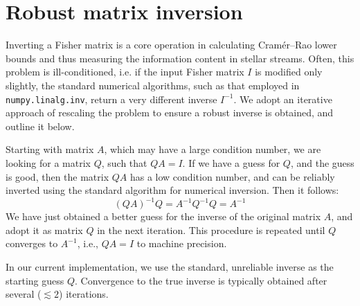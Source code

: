 \documentclass[modern]{aastex61}
\begin{document}



\appendix
\section{Robust matrix inversion}
Inverting a Fisher matrix is a core operation in calculating Cram\' er--Rao lower bounds and thus measuring the information content in stellar streams. 
Often, this problem is ill-conditioned, i.e. if the input Fisher matrix $I$ is modified only slightly, the standard numerical algorithms, such as that employed in \texttt{numpy.linalg.inv}, return a very different inverse $I^{-1}$.
We adopt an iterative approach of rescaling the problem to ensure a robust inverse is obtained, and outline it below.

Starting with matrix $A$, which may have a large condition number, we are looking for a matrix $Q$, such that $Q A = I$.
If we have a guess for $Q$, and the guess is good, then the matrix $QA$ has a low condition number, and can be reliably inverted using the standard algorithm for numerical inversion.
Then it follows:
\begin{equation*}
(QA)^{-1} Q = A^{-1} Q^{-1} Q = A^{-1}
\end{equation*}
We have just obtained a better guess for the inverse of the original matrix $A$, and adopt it as matrix $Q$ in the next iteration.
This procedure is repeated until $Q$ converges to $A^{-1}$, i.e., $Q A = I$ to machine precision.

In our current implementation, we use the standard, unreliable inverse as the starting guess $Q$. 
Convergence to the true inverse is typically obtained after several ($\lesssim2$) iterations.
\end{document}
